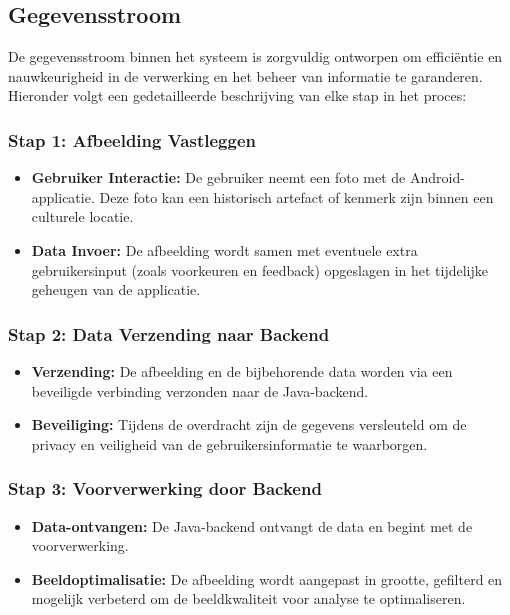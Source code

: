 \subsection{Gegevensstroom}

De gegevensstroom binnen het systeem is zorgvuldig ontworpen om efficiëntie en nauwkeurigheid in de verwerking en het beheer van informatie te garanderen. Hieronder volgt een gedetailleerde beschrijving van elke stap in het proces:

\subsubsection{Stap 1: Afbeelding Vastleggen}
\begin{itemize}
    \item \textbf{Gebruiker Interactie:} De gebruiker neemt een foto met de Android-applicatie. Deze foto kan een historisch artefact of kenmerk zijn binnen een culturele locatie.
    \item \textbf{Data Invoer:} De afbeelding wordt samen met eventuele extra gebruikersinput (zoals voorkeuren en feedback) opgeslagen in het tijdelijke geheugen van de applicatie.
\end{itemize}

\subsubsection{Stap 2: Data Verzending naar Backend}
\begin{itemize}
    \item \textbf{Verzending:} De afbeelding en de bijbehorende data worden via een beveiligde verbinding verzonden naar de Java-backend.
    \item \textbf{Beveiliging:} Tijdens de overdracht zijn de gegevens versleuteld om de privacy en veiligheid van de gebruikersinformatie te waarborgen.
\end{itemize}

\subsubsection{Stap 3: Voorverwerking door Backend}
\begin{itemize}
    \item \textbf{Data-ontvangen:} De Java-backend ontvangt de data en begint met de voorverwerking.
    \item \textbf{Beeldoptimalisatie:} De afbeelding wordt aangepast in grootte, gefilterd en mogelijk verbeterd om de beeldkwaliteit voor analyse te optimaliseren.
\end{itemize}

